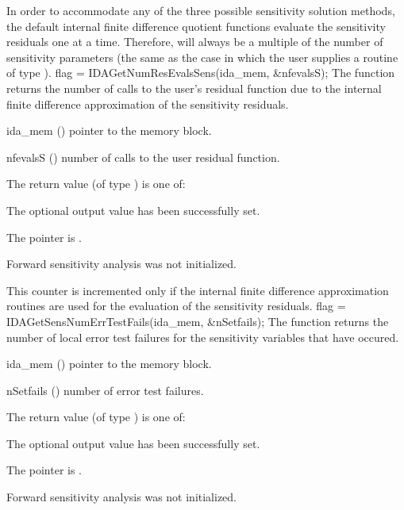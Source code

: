 {
  In order to accommodate any of the three possible sensitivity solution methods,
  the default internal 
  finite difference quotient functions evaluate the sensitivity residuals 
  one at a time. Therefore,  will always be a multiple of the
  number of sensitivity parameters (the same as the case in which the user supplies
  a routine of type ).
}
{
  flag = IDAGetNumResEvalsSens(ida\_mem, \&nfevalsS);
}
{
  The function  returns the number of calls to the
  user's residual function due to the internal finite difference approximation
  of the sensitivity residuals.
}
{
  \begin{args}
  \item[ida\_mem] ()
    pointer to the {\idas} memory block.
  \item[nfevalsS] ()
    number of calls to the user residual function.
  \end{args}
}
{
  The return value  (of type ) is one of:
  \begin{args}
  \item[\Id{IDA\_SUCCESS}] 
    The optional output value has been successfully set.
  \item[\Id{IDA\_MEM\_NULL}]
    The  pointer is .
  \item[\Id{IDA\_NO\_SENS}]
    Forward sensitivity analysis was not initialized.
  \end{args}
}
{
  This counter is incremented only if the internal finite difference approximation
  routines are used for the evaluation of the sensitivity residuals.
}
{
  flag = IDAGetSensNumErrTestFails(ida\_mem, \&nSetfails);
}
{
  The function  returns the number of local
  error test failures for the sensitivity variables that have occured.
}
{
  \begin{args}
  \item[ida\_mem] ()
    pointer to the {\idas} memory block.
  \item[nSetfails] ()
    number of error test failures.
  \end{args}
}
{
  The return value  (of type ) is one of:
  \begin{args}
  \item[\Id{IDA\_SUCCESS}] 
    The optional output value has been successfully set.
  \item[\Id{IDA\_MEM\_NULL}]
    The  pointer is .
  \item[\Id{IDA\_NO\_SENS}]
    Forward sensitivity analysis was not initialized.
  \end{args}
}
